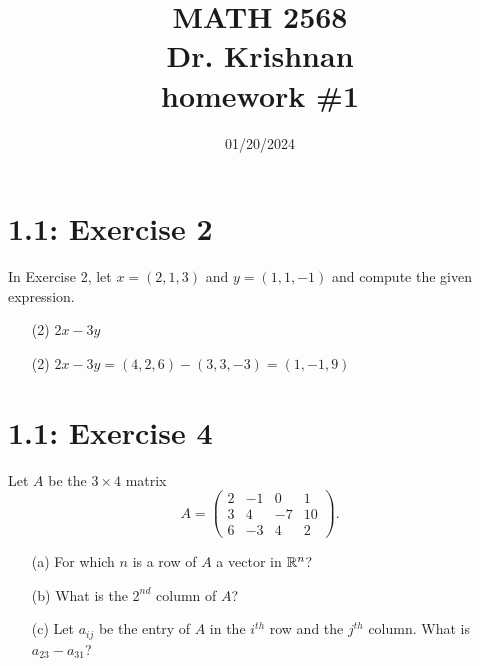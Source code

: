 \documentclass{report}
\title{\Huge{MATH 2568}\\\huge{Dr. Krishnan}\\homework \#1}
\author{\Huge{\mylink{https://www.sohumsuthar.com}{Sohum Suthar}}}
\date{\huge {01/20/2024}}
\begin{document}
\maketitle
\newpage
{}	
\tableofcontents
\pagebreak





\section*{1.1: Exercise 2} 

In Exercise 2, let $x=(2,1,3)$ and 
$y=(1,1,-1)$ and compute the given expression.

\begin{enumerate}
    \item[(2)] $2x-3y$
    
\end{enumerate}

\sol 

\begin{enumerate}
\item[(2)]     
 $2x - 3y = (4,2,6) - (3,3,-3) = \boxed{(1,-1,9)} $
\end{enumerate}







\section*{1.1: Exercise 4} 

Let $A$ be the $3\times 4$ matrix
\[
A=\left(\begin{array}{rrrr} 2 & -1 & 0 & 1 \\ 3 & 4 & -7 & 10\\
        6 & -3 & 4 & 2 \end{array}\right).
\]

\begin{enumerate}
    \item[(a)] For which $n$ is a row of $A$ a vector in $\RR^n$? 
    
    \item[(b)] What is the $2^{nd}$ column of $A$?

    
    \item[(c)] Let $a_{ij}$ be the entry of $A$ in the $i^{th}$ row and the $j^{th}$ column. What is $a_{23}-a_{31}$?

\end{enumerate}
\end{document}
